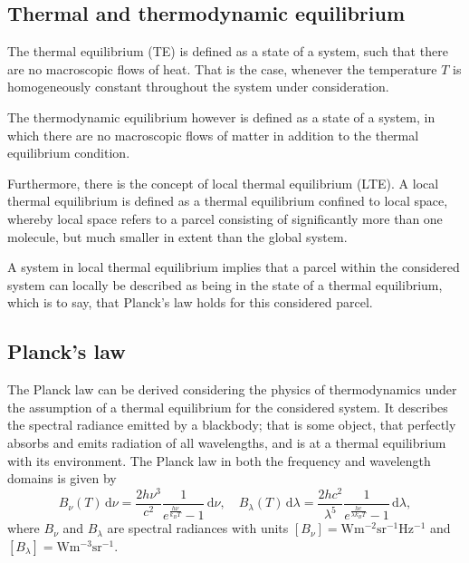 \documentclass[a4paper,12pt]{report}
\begin{document}
\subsection{Thermal and thermodynamic equilibrium}
The thermal equilibrium (TE) is defined as a state of a system, such that there are no macroscopic flows of heat. That is the case, whenever the temperature $T$ is homogeneously constant throughout the system under consideration.

The thermodynamic equilibrium however is defined as a state of a system, in which there are no macroscopic flows of matter in addition to the thermal equilibrium condition.

Furthermore, there is the concept of local thermal equilibrium (LTE). A local thermal equilibrium is defined as a thermal equilibrium confined to local space, whereby local space refers to a parcel consisting of significantly more than one molecule, but much smaller in extent than the global system.

A system in local thermal equilibrium implies that a parcel within the considered system can locally be described as being in the state of a thermal equilibrium, which is to say, that Planck's law holds for this considered parcel.

\subsection{Planck's law}
The Planck law can be derived considering the physics of thermodynamics under the assumption of a thermal equilibrium for the considered system. It describes the spectral radiance emitted by a blackbody; that is some object, that perfectly absorbs and emits radiation of all wavelengths, and is at a thermal equilibrium with its environment. The Planck law in both the frequency and wavelength domains is given by
\begin{equation}\label{eq:Plancklaw}
B_\nu(T)\,\mathrm{d}\nu = \frac{2h\nu^3}{c^2}\frac{1}{e^{\frac{h\nu}{k_BT}}-1}\,\mathrm{d}\nu, \quad B_\lambda(T)\,\mathrm{d}\lambda = \frac{2hc^2}{\lambda^5}\frac{1}{e^{\frac{hc}{\lambda k_B T}}-1}\,\mathrm{d}\lambda,
\end{equation} where $B_\nu$ and $B_\lambda$ are spectral radiances with units $[B_\nu] = \si{\watt\meter^{-2}\steradian^{-1}\hertz^{-1}}$ and $[B_\lambda] = \si{\watt\meter^{-3}\steradian^{-1}}$.
\end{document}
